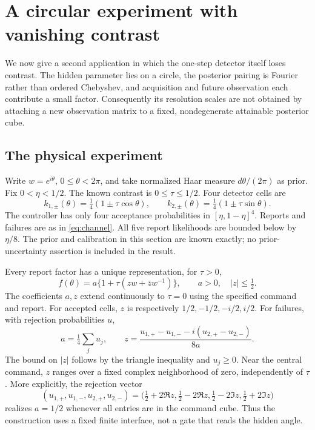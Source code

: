 \section{A circular experiment with vanishing contrast}
\label{sec:circular}
We now give a second application in which the one-step detector itself
loses contrast. The hidden parameter lies on a circle, the posterior
pairing is Fourier rather than ordered Chebyshev, and acquisition and
future observation each contribute a small factor. Consequently its
resolution scales are not obtained by attaching a new observation
matrix to a fixed, nondegenerate attainable posterior cube.

\subsection{The physical experiment}
Write $w=e^{i\theta}$, $0\le\theta<2\pi$, and take normalized Haar
measure $d\theta/(2\pi)$ as prior. Fix $0<\eta<1/2$. The known
contrast is $0\le\tau\le1/2$. Four detector cells are
\begin{equation}\label{eq:circle-cells}
 k_{1,\pm}(\theta)=\tfrac14(1\pm\tau\cos\theta),\qquad
 k_{2,\pm}(\theta)=\tfrac14(1\pm\tau\sin\theta).
\end{equation}
The controller has only four acceptance probabilities in
$[\eta,1-\eta]^4$. Reports and failures are as in
\eqref{eq:channel}. All five report likelihoods are bounded below by
$\eta/8$. The prior and calibration in this section are known exactly;
no prior-uncertainty assertion is included in the result.

Every report factor has a unique representation, for $\tau>0$,
\begin{equation}\label{eq:circle-factor}
 f(\theta)=a\{1+\tau(z w+\bar z w^{-1})\},
 \qquad a>0,\quad |z|\le\tfrac12.
\end{equation}
The coefficients $a,z$ extend continuously to $\tau=0$ using the
specified command and report. For accepted cells, $z$ is respectively
$1/2,-1/2,-i/2,i/2$. For failures, with rejection probabilities $u$,
\begin{equation}\label{eq:circle-command-coordinates}
 a=\tfrac14\sum_j u_j,\qquad
 z=\frac{u_{1,+}-u_{1,-}-i(u_{2,+}-u_{2,-})}{8a}.
\end{equation}
The bound on $|z|$ follows by the triangle inequality and $u_j\ge0$.
Near the central command, $z$ ranges over a fixed complex neighborhood
of zero, independently of $\tau$. More explicitly, the rejection vector
\begin{equation}\label{eq:circle-right-inverse}
 (u_{1,+},u_{1,-},u_{2,+},u_{2,-})
 =\bigl(\tfrac12+2\Re z,\tfrac12-2\Re z,
        \tfrac12-2\Im z,\tfrac12+2\Im z\bigr)
\end{equation}
realizes $a=1/2$ whenever all entries are in the command cube.
Thus the construction uses a fixed finite interface, not a gate that
reads the hidden angle.

